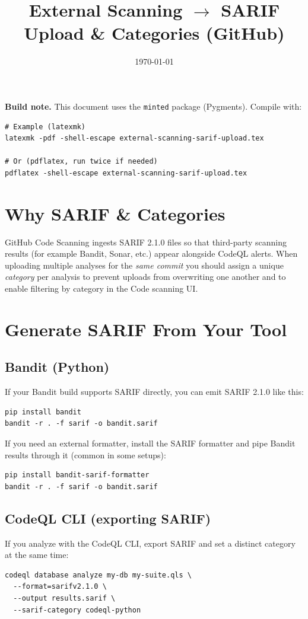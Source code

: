 \documentclass[11pt,a4paper]{article}
\title{External Scanning $\rightarrow$ SARIF Upload \& Categories (GitHub)}
\author{}
\date{\today}
\providecommand{\term}[1]{\texttt{#1}}
\begin{document}
\maketitle

\noindent\textbf{Build note.} This document uses the \term{minted} package (Pygments). Compile with:
\begin{verbatim}
# Example (latexmk)
latexmk -pdf -shell-escape external-scanning-sarif-upload.tex

# Or (pdflatex, run twice if needed)
pdflatex -shell-escape external-scanning-sarif-upload.tex
\end{verbatim}

\section{Why SARIF \& Categories}
GitHub Code Scanning ingests SARIF 2.1.0 files so that third-party scanning results (for example Bandit, Sonar, etc.) appear alongside CodeQL alerts. When uploading multiple analyses for the \emph{same commit} you should assign a unique \emph{category} per analysis to prevent uploads from overwriting one another and to enable filtering by category in the Code scanning UI.

\section{Generate SARIF From Your Tool}
\subsection{Bandit (Python)}
If your Bandit build supports SARIF directly, you can emit SARIF 2.1.0 like this:
\begin{verbatim}
pip install bandit
bandit -r . -f sarif -o bandit.sarif
\end{verbatim}

If you need an external formatter, install the SARIF formatter and pipe Bandit results through it (common in some setups):
\begin{verbatim}
pip install bandit-sarif-formatter
bandit -r . -f sarif -o bandit.sarif
\end{verbatim}

\subsection{CodeQL CLI (exporting SARIF)}
If you analyze with the CodeQL CLI, export SARIF and set a distinct category at the same time:
\begin{verbatim}
codeql database analyze my-db my-suite.qls \
  --format=sarifv2.1.0 \
  --output results.sarif \
  --sarif-category codeql-python
\end{verbatim}
\end{document}
